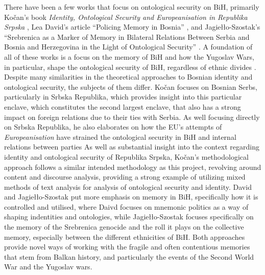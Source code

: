 There have been a few works that focus on ontological security on BiH, primarily Kočan's book \textit{Identity, Ontological Security and Europeanisation in Republika Srpska} \parencite*{kocanIdentityOntologicalSecurity2023}, Lea David's article ``Policing Memory in Bosnia'' \parencite*{davidPolicingMemoryBosnia2019}, and Jagiełło-Szostak's ``Srebrenica as a Marker of Memory in Bilateral Relations Between Serbia and Bosnia and Herzegovina in the Light of Ontological Security'' \parencite*{jagiello-szostakSrebrenicaMarkerMemory2025}. A foundation of all of these works is a focus on the memory of BiH and how the Yugoslav Wars, in particular, shape the ontological security of BiH, regardless of ethnic divides \parencites[][p. 107-119]{kocanIdentityOntologicalSecurity2023}[][p. 216-220]{davidPolicingMemoryBosnia2019}[][p. 4-5]{jagiello-szostakSrebrenicaMarkerMemory2025}. Despite many similarities in the theoretical approaches to Bosnian identity and ontological security, the subjects of them differ. Kočan \parencite*[][p. 120-125]{kocanIdentityOntologicalSecurity2023} focuses on Bosnian Serbs, particularly in Srbska Republika, which provides insight into this particular enclave, which constitutes the second largest enclave, that also has a strong impact on foreign relations due to their ties with Serbia. As well focusing directly on Srbska Republika, he also elaborates on how the EU's attempts of \textit{Europeanisation} have strained the ontological security in BiH and internal relations between parties \Parencite[][p. 125-130]{kocanIdentityOntologicalSecurity2023} As well as substantial insight into the context regarding identity and ontological security of Republika Srpska, Kočan's \parencite*[][p. 149-155]{kocanIdentityOntologicalSecurity2023} methodological approach follows a similar intended methodology as this project, revolving around content and discourse analysis, providing a strong example of utilizing mixed methods of text analysis for analysis of ontological security and identity. David \parencite*[][p. 216-220]{davidPolicingMemoryBosnia2019} and Jagiełło-Szostak \parencite*[][p. 6-10]{jagiello-szostakSrebrenicaMarkerMemory2025} put more emphasis on memory in BiH, specifically how it is controlled and utilised, where Daivd focuses on mnemonic politics as a way of shaping indentities and ontologies, while Jagiełło-Szostak focuses specifically on the memory of the Srebrenica genocide and the roll it plays on the collective memory, especially between the different ethnicities of BiH. Both approaches provide novel ways of working with the fragile and often contentious memories that stem from Balkan history, and particularly the events of the Second World War and the Yugoslav wars.

